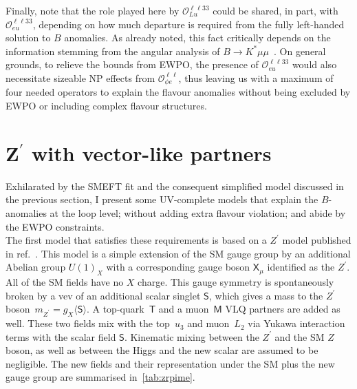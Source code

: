 Finally, note that the role played here by $\mathcal{O}_{Lu}^{\ell \ell 3 3}$ could be shared, in part, with $\mathcal{O}_{eu}^{\ell \ell 3 3}$, depending on how much departure is required from the fully left-handed solution to $B$ anomalies. As already noted, this fact critically depends on the information stemming from the angular analysis of $B \to K^{*} \mu \mu$~\cite{Ciuchini:2019usw}. On general grounds, to relieve the bounds from EWPO, the presence of $\mathcal{O}_{eu}^{\ell \ell 3 3}$ would also necessitate sizeable NP effects from $\mathcal{O}_{\phi e}^{\ell \ell}$, thus leaving us with a maximum of four needed operators to explain the flavour anomalies without being excluded by EWPO or including complex flavour structures.
\section{\texorpdfstring{Z$^{\prime}$}{Z'} with vector-like partners}
\label{sec:mod_Zprime}
Exhilarated by the SMEFT fit and the consequent simplified model discussed in the previous section, I present some UV-complete models that explain the $B$-anomalies at the loop level; without adding extra flavour violation; and abide by the EWPO constraints.  \\  The first model that satisfies these requirements is based on a $Z^\prime$ model published in ref.~\cite{Kamenik:2017tnu}.  This model is a simple extension of the SM gauge group by an additional Abelian group $U(1)_X$ with a corresponding gauge boson $\mathsf{X}_{\mu}$ identified as the $Z^\prime$. All of the SM fields have no $X$ charge. This gauge symmetry is spontaneously broken by a vev of an additional scalar singlet $\mathsf{S}$, which gives a mass to the $Z^\prime$ boson~$m_{Z^{\prime}} = g_{X} \langle \mathsf{S} \rangle $. A top-quark~$\mathsf{T}$ and a muon~$\mathsf{M}$ VLQ partners are added as well. These two fields mix with the top~$u_3$ and muon~$L_2$ via Yukawa interaction terms with the scalar field $\mathsf S$. Kinematic mixing between the $Z^\prime$ and the SM $Z$ boson, as well as between the Higgs and the new scalar are assumed to be negligible. The new fields and their representation under the SM plus the new gauge group are summarised in~\autoref{tab:zrpime}. \\
